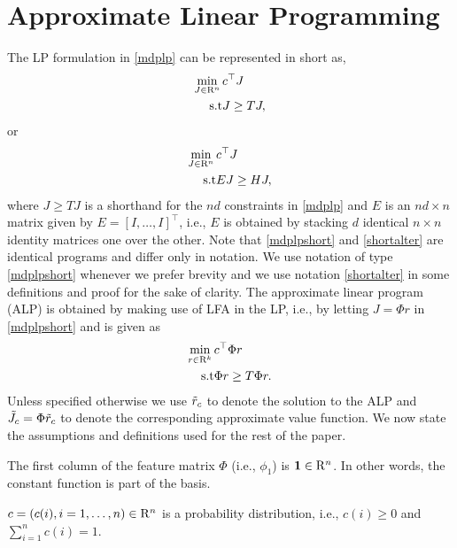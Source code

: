 \section{Approximate Linear Programming}
The LP formulation in \eqref{mdplp} can be represented in short as,
\begin{align}
\begin{split}
\label{mdplpshort}
\min_{J\in \R^n}\, &c^\top J\\
\text{s.t}\mb &J\geq T J,
\end{split}
\end{align}
or 
\begin{align}
\begin{split}
\label{shortalter}
\min_{J\in \R^n} \,&c^\top J\\
\text{s.t}\mb &EJ\geq H J,
\end{split}
\end{align}
where $J\geq TJ$ is a shorthand for the $nd$ constraints in \eqref{mdplp} and $E$ is an $nd\times n$ matrix given by $E=[I,\ldots,I]^\top$, i.e., $E$ is obtained by stacking $d$ identical $n\times n$ identity matrices one over the other. Note that \eqref{mdplpshort} and \eqref{shortalter} are identical programs and differ only in notation. We use notation of type \eqref{mdplpshort} whenever we prefer brevity and we use notation \eqref{shortalter} in some definitions and proof for the sake of clarity.
The approximate linear program (ALP) is obtained by making use of LFA in the LP, i.e., by letting $J=\Phi r$ in \eqref{mdplpshort} and is given as
\begin{align}\label{alp}
\begin{split}
\min_{r\in \R^k}\, &c^\top \Phi r\\
\text{s.t}\mb &\Phi r\geq T \Phi r.
\end{split}
\end{align}
Unless specified otherwise we use $\tilde{r}_c$ to denote the solution to the ALP and $\tilde{J}_c=\Phi \tilde{r}_c$ to denote the corresponding approximate value function. We now state the assumptions and definitions used for the rest of the paper.
\begin{assumption}\label{one}
The first column of the feature matrix $\Phi$ (i.e., $\phi_1$) is $\mathbf{1} \in \mathrm{R}^n$. In other words, the constant function is part of the basis.
\end{assumption}
\begin{assumption}\label{probdist}
$c=(c(i),i=1,\ldots,n)\in \mathrm{R}^n$ is a probability distribution, i.e., $c(i)\geq 0$ and $\sum_{i=1}^n c(i)=1$.
\end{assumption}
